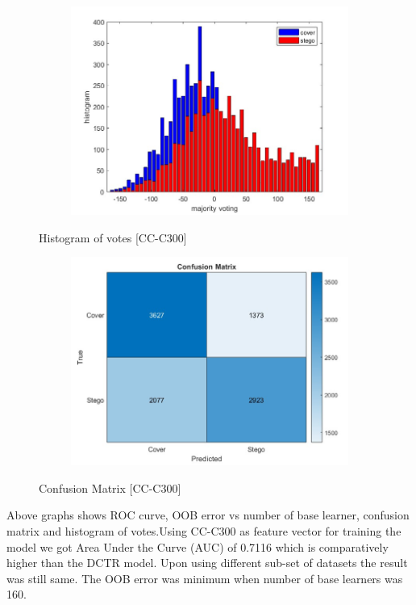 \begin{figure}[H]
    \centering
    \begin{subfigure}[b]{0.5\textwidth}
        \includegraphics[width=\textwidth]{img/histo300.jpg}
    \end{subfigure}
    \caption{Histogram of votes [CC-C300]}
\begin{table}[H]
    \centering
        \begin{subfigure}[b]{0.5\textwidth}
            \includegraphics[width=\textwidth]{img/confusion300.jpg}
        \end{subfigure}
    \caption{Confusion Matrix [CC-C300]}
\end{table}
\end{figure}
\begin{flushleft}
Above graphs shows ROC curve, OOB error vs number of base learner, confusion matrix and histogram of votes.Using CC-C300 as feature vector for training the model we got Area Under the Curve (AUC) of 0.7116 which is comparatively higher than the DCTR model. Upon using different sub-set of datasets the result was still same. The OOB error was minimum when number of base learners was 160.
\end{flushleft}
\clearpage
